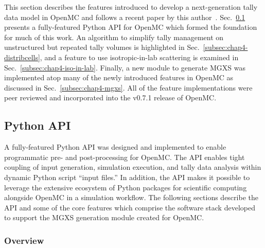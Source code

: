 

This section describes the features introduced to develop a next-generation tally data model in OpenMC and follows a recent paper by this author~\cite{boyd2016bigdata}. Sec.~\ref{subsec:chap4-py-api} presents a fully-featured Python \ac{API} for OpenMC which formed the foundation for much of this work. An algorithm to simplify tally management on unstructured but repeated tally volumes is highlighted in Sec.~\ref{subsec:chap4-distribcells}, and a feature to use isotropic-in-lab scattering is examined in Sec.~\ref{subsec:chap4-iso-in-lab}. Finally, a new module to generate \ac{MGXS} was implemented atop many of the newly introduced features in OpenMC as discussed in Sec.~\ref{subsec:chap4-mgxs}. All of the feature implementations were peer reviewed and incorporated into the v0.7.1 release of OpenMC.

\subsection{Python API}
\label{subsec:chap4-py-api}

A fully-featured Python \ac{API} was designed and implemented to enable programmatic pre- and post-processing for OpenMC. The \ac{API} enables tight coupling of input generation, simulation execution, and tally data analysis within dynamic Python script ``input files.'' In addition, the \ac{API} makes it possible to leverage the extensive ecosystem of Python packages for scientific computing alongside OpenMC in a simulation workflow. The following sections describe the \ac{API} and some of the core features which comprise the software stack developed to support the \ac{MGXS} generation module created for OpenMC.

\subsubsection{Overview}
\label{subsubsec:chap4-py-api-overview}

